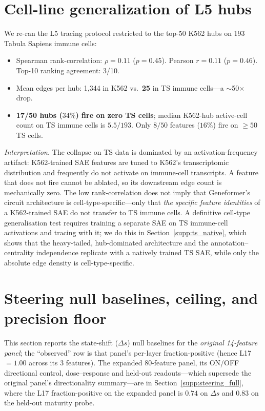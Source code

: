 \documentclass[10pt,letterpaper]{article}
\begin{document}
\section{Cell-line generalization of L5 hubs}
\label{supp:celltype_generalization}

We re-ran the L5 tracing protocol restricted to the top-50 K562 hubs on 193 Tabula Sapiens immune cells:
\begin{itemize}
\item Spearman rank-correlation: $\rho=0.11$ ($p=0.45$). Pearson $r=0.11$ ($p=0.46$). Top-10 ranking agreement: 3/10.
\item Mean edges per hub: 1{,}344 in K562 vs.\ \textbf{25} in TS immune cells---a $\sim$50$\times$ drop.
\item \textbf{17/50 hubs ($34\%$) fire on zero TS cells}; median K562-hub active-cell count on TS immune cells is $5.5/193$. Only $8/50$ features ($16\%$) fire on $\geq 50$ TS cells.
\end{itemize}
\emph{Interpretation.} The collapse on TS data is dominated by an activation-frequency artifact: K562-trained SAE features are tuned to K562's transcriptomic distribution and frequently do not activate on immune-cell transcripts. A feature that does not fire cannot be ablated, so its downstream edge count is mechanically zero. The low rank-correlation does not imply that Geneformer's circuit architecture is cell-type-specific---only that \emph{the specific feature identities} of a K562-trained SAE do not transfer to TS immune cells. A definitive cell-type generalisation test requires training a separate SAE on TS immune-cell activations and tracing with it; we do this in Section~\ref{supp:ts_native}, which shows that the heavy-tailed, hub-dominated architecture and the annotation--centrality independence replicate with a natively trained TS SAE, while only the absolute edge density is cell-type-specific.


\section{Steering null baselines, ceiling, and precision floor}
\label{supp:steering_nulls}

This section reports the state-shift ($\Delta s$) null baselines for the \emph{original 14-feature panel}; the ``observed'' row is that panel's per-layer fraction-positive (hence L17 $=1.00$ across its 3 features). The expanded 80-feature panel, its ON/OFF directional control, dose--response and held-out readouts---which supersede the original panel's directionality summary---are in Section~\ref{supp:steering_full}, where the L17 fraction-positive on the expanded panel is $0.74$ on $\Delta s$ and $0.83$ on the held-out maturity probe.
\end{document}
